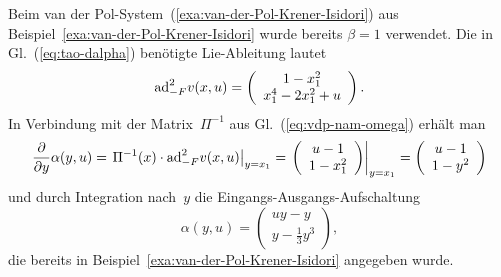 \begin{example}
\label{exa:vdp-Tao}Beim van der Pol-System~(\ref{exa:van-der-Pol-Krener-Isidori})
aus Beispiel~\ref{exa:van-der-Pol-Krener-Isidori} wurde bereits
$\beta=1$ verwendet. Die in Gl.~(\ref{eq:tao-dalpha}) benötigte
Lie-Ableitung lautet
\begin{equation}
{\operatorname{ad}}_{-F}^{2}v(x,u)=\left(\begin{array}{c}
1-x_{1}^{2}\\
x_{1}^{4}-2x_{1}^{2}+u
\end{array}\right).\label{eq:vdp-ad-n}
\end{equation}
In Verbindung mit der Matrix~$\Pi^{-1}$ aus Gl.~(\ref{eq:vdp-nam-omega})
erhält man 
\[
\frac{\partial}{\partial y}\alpha(y,u)=\left.\Pi^{-1}(x)\cdot{\operatorname{ad}}_{-F}^{2}v(x,u)\right|_{y=x_{1}}=\left.\left(\begin{array}{c}
u-1\\
1-x_{1}^{2}
\end{array}\right)\right|_{y=x_{1}}=\left(\begin{array}{c}
u-1\\
1-y^{2}
\end{array}\right)
\]
und durch Integration nach~$y$ die Eingangs-Ausgangs-Aufschaltung
\[
\alpha(y,u)=\left(\begin{array}{c}
uy-y\\
y-\frac{1}{3}y^{3}
\end{array}\right),
\]
die bereits in Beispiel~\ref{exa:van-der-Pol-Krener-Isidori} angegeben
wurde.
\end{example}

